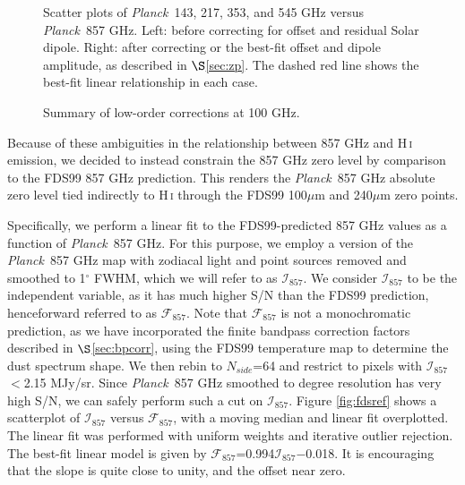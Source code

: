 \documentclass{emulateapj}
\newcommand{\PLANCK}{{\it Planck}}
\begin{document}
\begin{figure}
\begin{center}
\caption{\label{fig:dip}  Scatter plots of \PLANCK~143, 217, 353, and 545 GHz 
versus \PLANCK~857 GHz. Left: before correcting for offset and residual Solar 
dipole. Right: after correcting or the best-fit offset and dipole amplitude, as
described in $\S$\ref{sec:zp}. The dashed red line shows the best-fit linear 
relationship in each case.}
\end{center}
\end{figure}

\begin{figure*}
\begin{center}
\caption{\label{fig:quad} Summary of low-order corrections at 100 GHz.}
\end{center}
\end{figure*}

Because of these ambiguities in the relationship between 857 GHz and 
H\,\textsc{i} emission, we decided to instead constrain the 857 GHz zero level 
by comparison to the FDS99 857 GHz prediction. This renders the \PLANCK~857 GHz
absolute zero level tied indirectly to H\,\textsc{i} through the FDS99 
100$\mu$m and 240$\mu$m zero points. 

Specifically, we perform a linear fit to the FDS99-predicted 857 GHz values as 
a function of \PLANCK~857 GHz. For this purpose, we employ a version of the 
\PLANCK~857 GHz map with zodiacal light and point sources removed and smoothed 
to 1$^{\circ}$ FWHM, which we will refer to as $\mathcal{I}_{857}$. We 
consider $\mathcal{I}_{857}$ to be the independent variable, as it has much 
higher S/N than the FDS99 prediction, henceforward referred to as 
$\mathcal{F}_{857}$. Note that $\mathcal{F}_{857}$ is not a monochromatic 
prediction, as we have incorporated the finite bandpass correction factors 
described in $\S$\ref{sec:bpcorr}, using the FDS99 temperature map to determine
the dust spectrum shape. We then rebin to $N_{side}$=64 and restrict to pixels 
with $\mathcal{I}_{857}$$<$2.15 MJy/sr. Since \PLANCK~857 GHz smoothed to 
degree resolution has very high S/N, we can safely perform such a cut on 
$\mathcal{I}_{857}$. Figure \ref{fig:fdsref} shows a scatterplot of 
$\mathcal{I}_{857}$ versus $\mathcal{F}_{857}$, with a moving median and linear
fit overplotted. The linear fit was performed with uniform weights and 
iterative outlier rejection. The best-fit linear model is given by 
$\mathcal{F}_{857}$=0.994$\mathcal{I}_{857}$$-$0.018. It is encouraging that 
the slope is quite close to unity, and the offset near zero.
\end{document}
